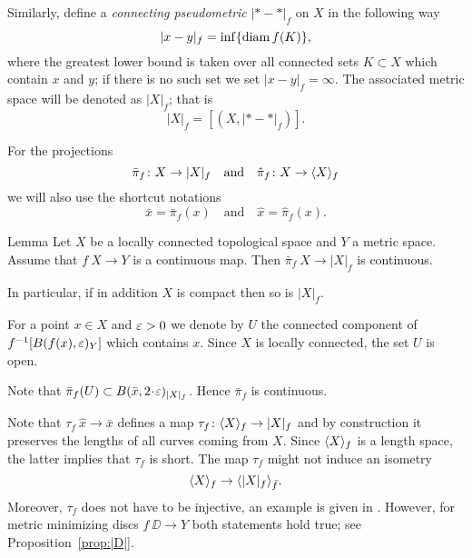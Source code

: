 \documentclass{article}
\begin{document}
Similarly, define a \emph{connecting pseudometric} $|{*}-{*}|_f$ on $X$ in
the following way
\[|x-y|_f=\inf\{\mathop{\rm diam}\nolimits f(K)\},\]
where the greatest lower bound is taken over all connected sets $K\subset X$ which contain $x$ and $y$;
if there is no such set we set $|x-y|_f=\infty$. 
The associated metric space will be
denoted as $|X|_f$;
that is 
\[| X|_f=[(X,|{*}-{*}|_f)].\]

For the projections 
\[\bar \pi_f\colon X\to |X|_f\quad\text{and}\quad \hat \pi_f\colon X\to \langle X\rangle_f\]
we will also use the shortcut notations 
\[\bar x=\bar\pi_f(x) \quad\text{and}\quad  \hat x= \hat \pi_f(x).\]

\begin{thm}{Lemma}\label{lem:picont}
Let $X$ be a locally connected topological space and $Y$ a metric space. Assume that $f\:X\to Y$ is a continuous map. 
Then $\bar\pi_f\:X\to|X|_f$ is continuous.

In particular, if in addition $X$ is compact then so is $|X|_f$.
\end{thm}

For a point $x\in X$ and $\varepsilon>0$ we denote by $U$ the connected component of $f^{-1}[B(f(x),\varepsilon)_{Y}]$ which contains $x$.
Since $X$ is locally connected, the set $U$ is open.

Note that $\bar\pi_f(U)\subset B(\bar x,2\cdot \eps)_{|X|_f}$. Hence
$\bar\pi_f$ is continuous.
\qeds



\begin{wrapfigure}{r}{37 mm}
\end{wrapfigure}

Note that $\tau_f\: \hat x\to \bar x$ defines a map $\tau_f\: \<X\>_f\zz\to |X|_f$ and by construction it preserves the lengths of
all curves coming from $X$.
Since $\langle X\rangle_f$ is a length space, the latter implies that $\tau_f$ is short.
The map $\tau_f$ might not induce an isometry
\[\langle X\rangle_f\to\langle|X|_f\rangle_{\bar f}.\]
Moreover, $\tau_f$ does not have to be injective, an example is given in \cite[4.2]{petrunin-intrinisic}.
However, for metric minimizing discs $f\:\DD\to Y$ both statements hold true; see
Proposition~\ref{prop:|D|}.
\end{document}
